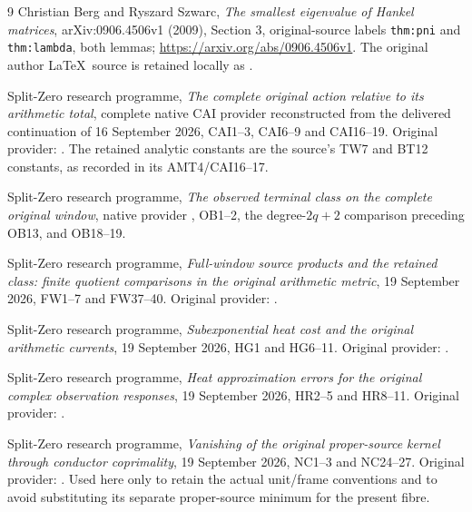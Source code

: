 \begin{thebibliography}{9}
Christian Berg and Ryszard Szwarc,
\emph{The smallest eigenvalue of Hankel matrices},
arXiv:0906.4506v1 (2009), Section 3, original-source labels
\texttt{thm:pni} and \texttt{thm:lambda}, both lemmas;
\url{https://arxiv.org/abs/0906.4506v1}.
The original author \LaTeX\ source is retained locally as
.

Split-Zero research programme,
\emph{The complete original action relative to its arithmetic total},
complete native CAI provider reconstructed from the delivered continuation
of 16 September 2026, CAI1--3, CAI6--9 and CAI16--19.
Original provider: .
The retained analytic constants are the source's TW7 and BT12 constants,
as recorded in its AMT4/CAI16--17.

Split-Zero research programme,
\emph{The observed terminal class on the complete original window},
native provider , OB1--2,
the degree-$2q+2$ comparison preceding OB13, and OB18--19.

Split-Zero research programme,
\emph{Full-window source products and the retained class:
finite quotient comparisons in the original arithmetic metric},
19 September 2026, FW1--7 and FW37--40.
Original provider: .

Split-Zero research programme,
\emph{Subexponential heat cost and the original arithmetic currents},
19 September 2026, HG1 and HG6--11.
Original provider: .

Split-Zero research programme,
\emph{Heat approximation errors for the original complex observation responses},
19 September 2026, HR2--5 and HR8--11.
Original provider: .

Split-Zero research programme,
\emph{Vanishing of the original proper-source kernel through conductor coprimality},
19 September 2026, NC1--3 and NC24--27.
Original provider: .
Used here only to retain the actual unit/frame conventions and to avoid
substituting its separate proper-source minimum for the present fibre.
\end{thebibliography}

